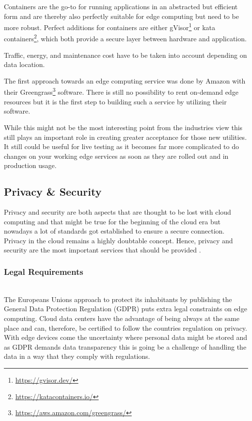 Containers are the go-to for running applications in an abstracted but efficient form and are thereby also perfectly suitable for edge computing but need to be more robust. Perfect additions for containers are either gVisor\footnote{\url{https://gvisor.dev/}} or kata containers\footnote{\url{https://katacontainers.io/}}, which both provide a secure layer between hardware and application.

Traffic, energy, and maintenance cost have to be taken into account depending on data location.

The first approach towards an edge computing service was done by Amazon with their Greengrass\footnote{\url{https://aws.amazon.com/greengrass/}} software. There is still no possibility to rent on-demand edge resources but it is the first step to building such a service by utilizing their software.

While this might not be the most interesting point from the industries view this still plays an important role in creating greater acceptance for those new utilities. It still could be useful for live testing as it becomes far more complicated to do changes on your working edge services as soon as they are rolled out and in production usage.

\subsection{Privacy \& Security}
Privacy and security are both aspects that are thought to be lost with cloud computing and that might be true for the beginning of the cloud era but nowadays a lot of standards got established to ensure a secure connection. Privacy in the cloud remains a highly doubtable concept. Hence, privacy and security are the most important services that should be provided \cite{GarciaLopez:2015:ECV:2831347.2831354}.

\subsubsection{Legal Requirements}\hspace*{\fill} \\
The Europeans Unions approach to protect its inhabitants by publishing the General Data Protection Regulation (GDPR) puts extra legal constraints on edge computing.
Cloud data centers have the advantage of being always at the same place and can, therefore, be certified to follow the countries regulation on privacy.
With edge devices come the uncertainty where personal data might be stored and as GDPR \cite{eu01} demands data transparency this is going be a challenge of handling the data in a way that they comply with regulations.

